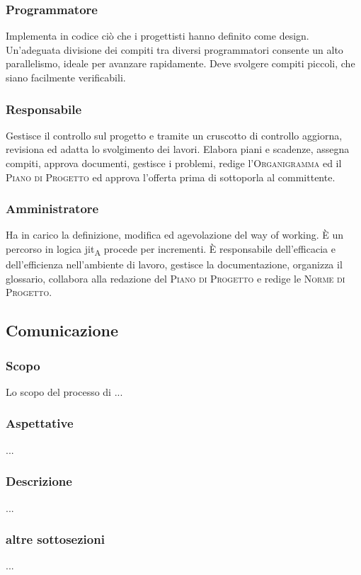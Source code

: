     \subsubsection{Programmatore}
    Implementa in codice ciò che i progettisti hanno definito come design. Un'adeguata divisione dei compiti tra diversi programmatori consente un alto parallelismo, ideale per avanzare rapidamente. Deve svolgere compiti piccoli, che siano facilmente verificabili.
    \subsubsection{Responsabile}
    Gestisce il controllo sul progetto e tramite un cruscotto di controllo aggiorna, revisiona ed adatta lo svolgimento dei lavori. Elabora piani e scadenze, assegna compiti, approva documenti, gestisce i problemi, redige l'\textsc{Organigramma} ed il \textsc{Piano di Progetto} ed approva l'offerta prima di sottoporla al committente.
    \subsubsection{Amministratore}
    Ha in carico la definizione, modifica ed agevolazione del way of working. È un percorso in logica \acrshort{jit}\textsubscript{A} procede per incrementi. È responsabile dell'efficacia e dell'efficienza nell'ambiente di lavoro, gestisce la documentazione, organizza il glossario, collabora alla redazione del \textsc{Piano di Progetto} e redige le \textsc{Norme di Progetto}.

\subsection{Comunicazione} %
    \subsubsection{Scopo}
    Lo scopo del processo di ...
    \subsubsection{Aspettative}
    ...
    \subsubsection{Descrizione}
    ...
    \subsubsection{altre sottosezioni}
    ...
